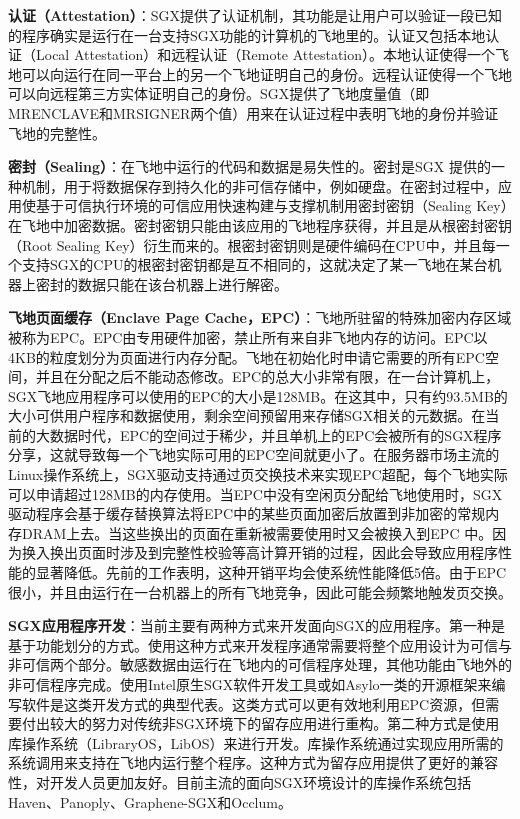 \textbf{认证（Attestation）}：SGX提供了认证机制，其功能是让用户可以验证一段已知的程序确实是运行在一台支持SGX功能的计算机的飞地里的。认证又包括本地认证（Local Attestation）和远程认证（Remote Attestation）。本地认证使得一个飞地可以向运行在同一平台上的另一个飞地证明自己的身份。远程认证使得一个飞地可以向远程第三方实体证明自己的身份。SGX提供了飞地度量值（即MRENCLAVE和MRSIGNER两个值）用来在认证过程中表明飞地的身份并验证飞地的完整性。

\textbf{密封（Sealing）}：在飞地中运行的代码和数据是易失性的。密封是SGX 提供的一种机制，用于将数据保存到持久化的非可信存储中，例如硬盘。在密封过程中，应用使基于可信执行环境的可信应用快速构建与支撑机制用密封密钥（Sealing Key）在飞地中加密数据。密封密钥只能由该应用的飞地程序获得，并且是从根密封密钥（Root Sealing Key）衍生而来的。根密封密钥则是硬件编码在CPU中，并且每一个支持SGX的CPU的根密封密钥都是互不相同的，这就决定了某一飞地在某台机器上密封的数据只能在该台机器上进行解密。

\textbf{飞地页面缓存（Enclave Page Cache，EPC）}：飞地所驻留的特殊加密内存区域被称为EPC。EPC由专用硬件加密，禁止所有来自非飞地内存的访问。EPC以4KB的粒度划分为页面进行内存分配。飞地在初始化时申请它需要的所有EPC空间，并且在分配之后不能动态修改。EPC的总大小非常有限，在一台计算机上，SGX飞地应用程序可以使用的EPC的大小是128MB。在这其中，只有约93.5MB的大小可供用户程序和数据使用，剩余空间预留用来存储SGX相关的元数据。在当前的大数据时代，EPC的空间过于稀少，并且单机上的EPC会被所有的SGX程序分享，这就导致每一个飞地实际可用的EPC空间就更小了。在服务器市场主流的Linux操作系统上，SGX驱动支持通过页交换技术来实现EPC超配，每个飞地实际可以申请超过128MB的内存使用。当EPC中没有空闲页分配给飞地使用时，SGX驱动程序会基于缓存替换算法将EPC中的某些页面加密后放置到非加密的常规内存DRAM上去。当这些换出的页面在重新被需要使用时又会被换入到EPC 中。因为换入换出页面时涉及到完整性校验等高计算开销的过程，因此会导致应用程序性能的显著降低。先前的工作表明，这种开销平均会使系统性能降低5倍。由于EPC很小，并且由运行在一台机器上的所有飞地竞争，因此可能会频繁地触发页交换。

\textbf{SGX应用程序开发}：当前主要有两种方式来开发面向SGX的应用程序。第一种是基于功能划分的方式。使用这种方式来开发程序通常需要将整个应用设计为可信与非可信两个部分。敏感数据由运行在飞地内的可信程序处理，其他功能由飞地外的非可信程序完成。使用Intel原生SGX软件开发工具或如Asylo一类的开源框架来编写软件是这类开发方式的典型代表。这类方式可以更有效地利用EPC资源，但需要付出较大的努力对传统非SGX环境下的留存应用进行重构。第二种方式是使用库操作系统（LibraryOS，LibOS）来进行开发。库操作系统通过实现应用所需的系统调用来支持在飞地内运行整个程序。这种方式为留存应用提供了更好的兼容性，对开发人员更加友好。目前主流的面向SGX环境设计的库操作系统包括Haven、Panoply、Graphene-SGX和Occlum。

